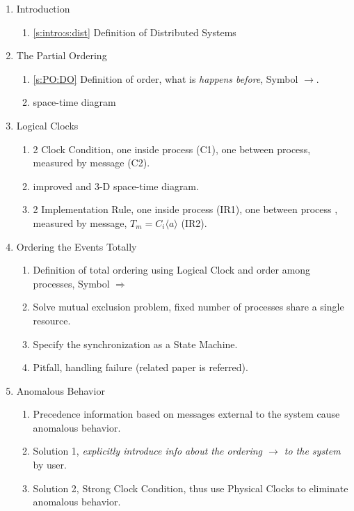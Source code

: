 \documentclass[12pt,a4paper,oneside]{article}
\begin{document}
\begin{enumerate}
  \item Introduction
  \begin{enumerate}
    \item \ref{s:intro:s:dist} Definition of Distributed Systems
  \end{enumerate}
  \item The Partial Ordering
  \begin{enumerate}
      \item \ref{s:PO:DO} Definition of order, what is \textit{happens before}, Symbol $\rightarrow$. %
      \item space-time diagram
  \end{enumerate}
  \item Logical Clocks
  \begin{enumerate}
      \item 2 Clock Condition, one inside process (C1), one between process, measured by message (C2).
      \item improved and 3-D space-time diagram.
      \item 2 Implementation Rule, one inside process (IR1), one between process , measured by message, $T_m = C_i\langle a \rangle$ (IR2).
  \end{enumerate}
  \item Ordering the Events Totally
  \begin{enumerate}
      \item Definition of total ordering using Logical Clock and order among processes, Symbol $\Rightarrow$
      \item Solve mutual exclusion problem, fixed number of processes share a single resource.
      \item Specify the synchronization as a State Machine.
      \item Pitfall, handling failure (related paper is referred).
  \end{enumerate}
  \item Anomalous Behavior
  \begin{enumerate}
      \item Precedence information based on messages external to the system cause anomalous behavior.
      \item Solution 1, \textit{explicitly introduce info about the ordering $\rightarrow$ to the system} by user.
      \item Solution 2, Strong Clock Condition, thus use Physical Clocks to eliminate anomalous behavior.

\end{enumerate}
\end{enumerate}
\end{document}
